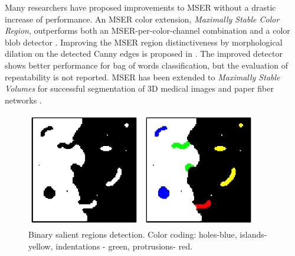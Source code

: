 \documentclass{article}
\begin{document}
Many researchers have proposed improvements to MSER without a drastic increase of performance. An MSER color extension, {\em Maximally Stable Color Region}, outperforms both an MSER-per-color-channel combination and a color blob detector \cite{Forssen07}. Improving the MSER region distinctiveness by morphological dilation on the detected Canny edges is proposed in \cite{Wang14}. The improved detector shows better performance for bag of words classification, but the evaluation of repeatability is not reported. MSER has been extended to {\em Maximally Stable Volumes} for successful segmentation of 3D medical images and paper fiber networks \cite{DonoserB06}.

\begin{figure}[htb]
\vspace{-0.5cm}
\begin{minipage}[b]{.49\linewidth}
  \centering
  \centerline{\includegraphics[width=5cm]{./Figs/binary_marks}}

\end{minipage}
\begin{minipage}[b]{0.49\linewidth}
  \centering
  \centerline{\includegraphics[width=5cm]{./Figs/binary_marks_clean_color_coded}}

\end{minipage}
\vspace{-0.5cm}
\caption{Binary salient regions detection.
Color coding: holes-blue, islands- yellow,
indentations - green, protrusions- red. }
\label{fig:binary_sal}
\end{figure}
\end{document}
